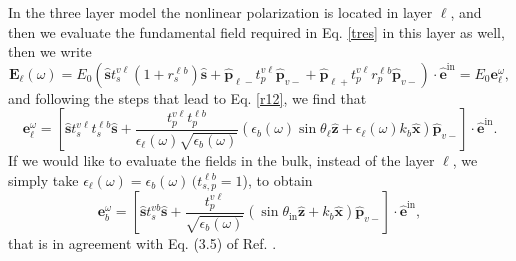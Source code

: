 \documentclass[10pt]{article}
\begin{document}
In the three layer model the nonlinear polarization is located in layer $\ell$,
and then we evaluate the fundamental field required in Eq. \eqref{tres} in this
layer as well, then we write
\begin{equation}\label{m2}
\mathbf{E}_{\ell}(\omega)=E_0\left(
\hat{\mathbf{s}} t^{v\ell}_s(1+r^{\ell b}_s)\hat{\mathbf{s}}
+
\hat{\mathbf{p}}_{\ell-}
 t^{v\ell}_{p}
\hat{\mathbf{p}}_{v-}
+
\hat{\mathbf{p}}_{\ell+}
t^{v\ell}_{p}r^{\ell b}_{p}
\hat{\mathbf{p}}_{v-}
\right)\cdot\hat{\mathbf{e}}^{\mathrm{in}}=E_0\mathbf{e}^\omega_{\ell}
,
\end{equation} 
and following the steps that lead to Eq. \eqref{r12}, we find that
\begin{equation}\label{m12}
\mathbf{e}^{\omega}_{\ell}
= \left[
\hat{\mathbf{s}}t_{s}^{v\ell}t_{s}^{\ell b}\hat{\mathbf{s}} 
+ \frac{t^{v\ell}_{p}t^{\ell b}_{p}}
       {\epsilon_{\ell}(\omega)\sqrt{\epsilon_{b}(\omega)}}
\left(
  \epsilon_{b}(\omega)\sin\theta_{\ell}\hat{\mathbf{z}}
+ \epsilon_{\ell}(\omega)k_{b}\hat{\mathbf{x}}
\right)
\hat{\mathbf{p}}_{v-}
\right]
\cdot\hat{\mathbf{e}}^{\mathrm{in}}.  
\end{equation}  
If we would like to evaluate the fields in the bulk, instead of the
layer $\ell$, we simply take 
$\epsilon_{\ell}(\omega)=\epsilon_{b}(\omega)\,(t^{\ell b}_{s,p}=1$), to obtain 
\begin{equation}\label{m13}
\mathbf{e}^{\omega}_{b}
= \left[
\hat{\mathbf{s}}t_{s}^{vb}\hat{\mathbf{s}}
+ \frac{t^{v\ell}_{p}}{\sqrt{\epsilon_{b}(\omega)}}
\left(
\sin\theta_{\mathrm{in}}\hat{\mathbf{z}} + k_{b}\hat{\mathbf{x}}
\right) 
\hat{\mathbf{p}}_{v-}
\right]
\cdot\hat{\mathbf{e}}^{\mathrm{in}},  
\end{equation} 
that is in agreement with Eq. (3.5) of Ref. \cite{mizrahiJOSA88}.
\end{document}
